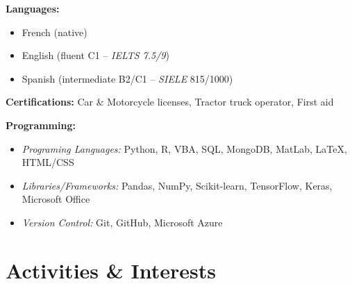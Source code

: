 \documentclass[a4paper,9pt]{extarticle}
\begin{document}
\noindent
\begin{minipage}[t]{0.45\textwidth} %
    \textbf{Languages:}
    \begin{itemize}
        \item French (native)
        \item English (fluent C1 -- \textit{IELTS 7.5/9})
        \item Spanish (intermediate B2/C1 -- \textit{SIELE} 815/1000)
    \end{itemize}
    \textbf{Certifications:} Car \& Motorcycle licenses, Tractor truck operator, First aid
\end{minipage}%
\hfill %
\begin{minipage}[t]{0.45\textwidth} %
    \textbf{Programming:}
    \begin{itemize}
        \item \textit{Programing Languages:} Python, R, VBA, SQL, MongoDB, MatLab, LaTeX, HTML/CSS
        \item \textit{Libraries/Frameworks:} Pandas, NumPy, Scikit-learn, TensorFlow, Keras, Microsoft Office
        \item \textit{Version Control:} Git, GitHub, Microsoft Azure
    \end{itemize}
\end{minipage}

\vspace{6pt}

\section*{\faHeart \hspace{0.1em} Activities \& Interests}
\end{document}
